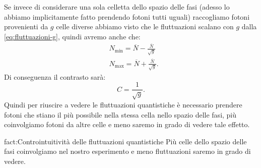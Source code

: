 Se invece di considerare una sola celletta dello spazio delle fasi (adesso lo abbiamo implicitamente fatto prendendo fotoni tutti uguali) raccogliamo fotoni provenienti da $g$ celle diverse abbiamo visto che le fluttuazioni scalano con  $g$ dalla \ref{eq:fluttuazioni-g}, quindi avremo anche che:
\[\begin{aligned}
	&N_\text{min} = \overline{N}-\frac{\overline{N}}{\sqrt{g}}\\
	&N_\text{max} = \overline{N} + \frac{\overline{N}}{\sqrt{g}}
.\end{aligned}\]
Di conseguenza il contrasto sarà:
\[
	C = \frac{1}{\sqrt{g}}
.\] 
Quindi per riuscire a vedere le fluttuazioni quantistiche è necessario prendere fotoni che stiano il più possibile nella stessa cella nello spazio delle fasi, più coinvolgiamo fotoni da altre celle e meno saremo in grado di vedere tale effetto.
\begin{fact}{fact:Controintuitività delle fluttuazioni quantistiche}
	Più celle dello spazio delle fasi coinvolgiamo nel nostro esperimento e meno fluttuazioni saremo in grado di vedere. 
\end{fact}

